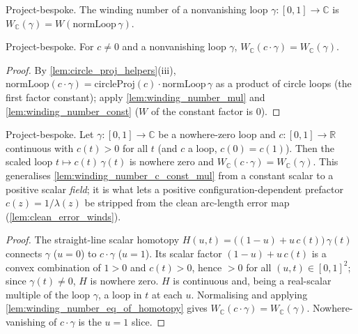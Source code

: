 \begin{definition}

  \label{def:winding_number_c}
  Project-bespoke. The winding number of a nonvanishing loop $\gamma : [0,1] \to
  \mathbb{C}$ is $W_{\mathbb{C}}(\gamma) = W(\mathrm{normLoop}\,\gamma)$.
\end{definition}

\begin{lemma}

  \label{lem:winding_number_c_const_mul}
  Project-bespoke. For $c\ne 0$ and a nonvanishing loop $\gamma$,
  $W_{\mathbb{C}}(c\cdot\gamma) = W_{\mathbb{C}}(\gamma)$.
\end{lemma}
\begin{proof}

\leanok
  By \cref{lem:circle_proj_helpers}(iii), $\mathrm{normLoop}(c\cdot\gamma) =
  \mathrm{circleProj}(c)\cdot\mathrm{normLoop}\,\gamma$ as a product of circle
  loops (the first factor constant); apply \cref{lem:winding_number_mul} and
  \cref{lem:winding_number_const} ($W$ of the constant factor is $0$).
\end{proof}

\begin{lemma}

  \label{lem:winding_number_c_pos_scalar_field}
  Project-bespoke. Let $\gamma:[0,1]\to\mathbb{C}$ be a nowhere-zero loop and
  $c:[0,1]\to\mathbb{R}$ continuous with $c(t)>0$ for all $t$ (and $c$ a loop,
  $c(0)=c(1)$). Then the scaled loop $t\mapsto c(t)\,\gamma(t)$ is nowhere zero and
  $W_{\mathbb{C}}(c\cdot\gamma)=W_{\mathbb{C}}(\gamma)$. This generalises
  \cref{lem:winding_number_c_const_mul} from a constant scalar to a positive scalar
  \emph{field}; it is what lets a positive configuration-dependent prefactor
  $c(z)=1/\lambda(z)$ be stripped from the clean arc-length error map
  (\cref{lem:clean_error_winds}).
\end{lemma}
\begin{proof}
  \leanok
  The straight-line scalar homotopy
  $H(u,t)=\bigl((1-u)+u\,c(t)\bigr)\,\gamma(t)$ connects $\gamma$ ($u=0$) to
  $c\cdot\gamma$ ($u=1$). Its scalar factor $(1-u)+u\,c(t)$ is a convex combination
  of $1>0$ and $c(t)>0$, hence $>0$ for all $(u,t)\in[0,1]^2$; since
  $\gamma(t)\neq0$, $H$ is nowhere zero. $H$ is continuous and, being a real-scalar
  multiple of the loop $\gamma$, a loop in $t$ at each $u$. Normalising and applying
  \cref{lem:winding_number_eq_of_homotopy} gives
  $W_{\mathbb{C}}(c\cdot\gamma)=W_{\mathbb{C}}(\gamma)$. Nowhere-vanishing of
  $c\cdot\gamma$ is the $u=1$ slice.
\end{proof}

